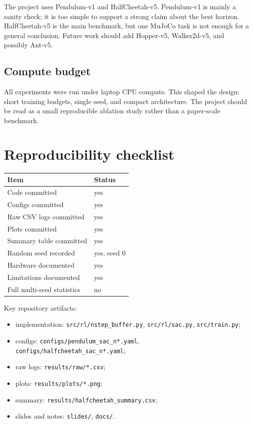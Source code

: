 \documentclass[
  american,
]{article}
\providecommand{\tightlist}{%
  \setlength{\itemsep}{0pt}\setlength{\parskip}{0pt}}
\begin{document}
The project uses Pendulum-v1 and HalfCheetah-v5. Pendulum-v1 is mainly a
sanity check; it is too simple to support a strong claim about the best
horizon. HalfCheetah-v5 is the main benchmark, but one MuJoCo task is
not enough for a general conclusion. Future work should add Hopper-v5,
Walker2d-v5, and possibly Ant-v5.

\subsection{Compute budget}\label{compute-budget}

All experiments were run under laptop CPU compute. This shaped the
design: short training budgets, single seed, and compact architecture.
The project should be read as a small reproducible ablation study rather
than a paper-scale benchmark.

\section{Reproducibility checklist}\label{reproducibility-checklist}

\begin{longtable}[]{@{}ll@{}}
\toprule\noalign{}
Item & Status \\
\midrule\noalign{}
\endhead
\bottomrule\noalign{}
\endlastfoot
Code committed & yes \\
Configs committed & yes \\
Raw CSV logs committed & yes \\
Plots committed & yes \\
Summary table committed & yes \\
Random seed recorded & yes, seed 0 \\
Hardware documented & yes \\
Limitations documented & yes \\
Full multi-seed statistics & no \\
\end{longtable}

Key repository artifacts:

\begin{itemize}
\tightlist
\item
  implementation: \texttt{src/rl/nstep\_buffer.py},
  \texttt{src/rl/sac.py}, \texttt{src/train.py};
\item
  configs: \texttt{configs/pendulum\_sac\_n*.yaml},
  \texttt{configs/halfcheetah\_sac\_n*.yaml};
\item
  raw logs: \texttt{results/raw/*.csv};
\item
  plots: \texttt{results/plots/*.png};
\item
  summary: \texttt{results/halfcheetah\_summary.csv};
\item
  slides and notes: \texttt{slides/}, \texttt{docs/}.
\end{itemize}
\end{document}
